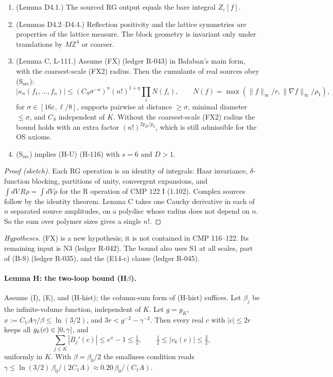 \begin{proposition}\label{src:D4D5}
\begin{enumerate}
\item[(a)] (Lemma D4.1.) The sourced RG output equals the bare integral $Z_\varepsilon[f]$.
\item[(b)] (Lemmas D4.2--D4.4.) Reflection positivity and the lattice symmetries are properties of the lattice measure. The block geometry is invariant only under translations by $M\mathbb Z^4$ or coarser.
\item[(c)] (Lemma C, L-111.) Assume (FX) (ledger R-043) in Ba{\l}aban's main form, with the coarsest-scale (FX2) radius. Then the cumulants of real sources obey (S$_{\mathrm{src}}$):
\[
|\kappa_n(f_1,\dots,f_n)|\le(C_S\sigma^{-a})^n(n!)^{1+\eta}\prod_iN(f_i),\qquad N(f)=\max(\|f\|_\infty/r,\|\nabla f\|_\infty/\rho_1),
\]
for $\sigma\in[16\varepsilon,\ell/8]$, supports pairwise at distance $\ge\sigma$, minimal diameter $\le\sigma$, and $C_S$ independent of $K$. Without the coarsest-scale (FX2) radius the bound holds with an extra factor $(n!)^{2p_R/p_0}$, which is still admissible for the OS axioms.
\item[(d)] (S$_{\mathrm{src}}$) implies (H-U) (H-116) with $s=6$ and $D>1$.
\end{enumerate}
\end{proposition}

\begin{proof}[Proof (sketch)]
Each RG operation is an identity of integrals: Haar invariance, $\delta$-function blocking, partitions of unity, convergent expansions, and $\int dV\,R\rho=\int dV\rho$ for the R operation of CMP 122 I (1.102). Complex sources follow by the identity theorem. Lemma C takes one Cauchy derivative in each of $n$ separated source amplitudes, on a polydisc whose radius does not depend on $n$. So the sum over polymer sizes gives a single $n!$.
\end{proof}

\emph{Hypotheses.} (FX) is a new hypothesis; it is not contained in CMP 116--122. Its remaining input is N3 (ledger R-042). The bound also uses S1 at all scales, part of (B-S) (ledger R-035), and the (E14-c) clause (ledger R-045).

\paragraph{Lemma H: the two-loop bound (H$\beta$).}

\begin{proposition}[Lemma H (L-182)]\label{src:HBETA}
Assume (I), (E), and (H-hist); the column-sum form of (H-hist) suffices. Let $\beta_j$ be the infinite-volume function, independent of $K$. Let $g=g_K$, $x:=C_1A\gamma/\beta\le\ln(3/2)$, and $3r<g^{-2}-\gamma^{-2}$. Then every real $c$ with $|c|\le2r$ keeps all $g_k(c)\in\mathopen{]}0,\gamma\mathclose{]}$, and
\[
\sum_{j\le K}|B_j'(c)|\le e^x-1\le\tfrac12,\qquad \tfrac12\le|v_k(c)|\le\tfrac32,
\]
uniformly in $K$. With $\beta=\beta_0/2$ the smallness condition reads $\gamma\le\ln(3/2)\,\beta_0/(2C_1A)\approx0.20\,\beta_0/(C_1A)$.
\end{proposition}

